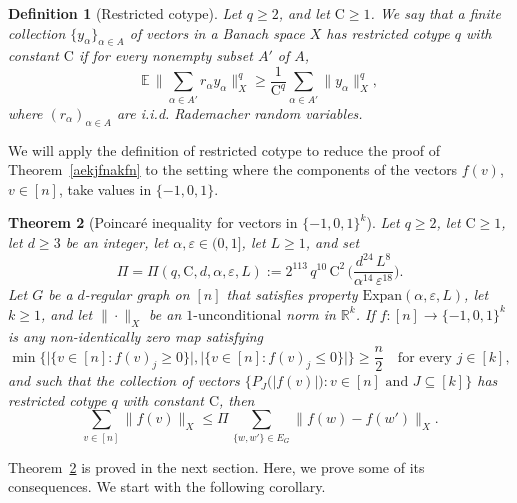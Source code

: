 \documentclass[11pt,leqno]{amsart}
\newtheorem{theorem}{Theorem}[section]
\newtheorem{definition}[theorem]{Definition}
\theoremstyle{remark}
\theoremstyle{plain}
\newcommand{\R}{\mathbb{R}}
\newcommand{\Exp}{\mathbb{E}}
\begin{document}
\begin{definition}[Restricted cotype]
Let $q \geqslant 2$, and let $\mathrm{C}\geqslant 1$. We say that a finite collection $\{y_\alpha\}_{\alpha\in A}$
of vectors in a Banach space $X$ has \emph{restricted cotype $q$ with constant $\mathrm{C}$}
if for every nonempty subset $A'$ of $A$,
\[ \Exp\,\Big\|\sum_{\alpha\in A'} r_\alpha y_\alpha\Big\|_X^q
\geqslant \frac{1}{\mathrm{C}^q} \sum_{\alpha\in A'} \|y_\alpha\|_X^q, \]
where $(r_\alpha)_{\alpha\in A}$ are i.i.d. Rademacher random variables.
\end{definition}
We will apply the definition of restricted cotype to reduce
the proof of Theorem~\ref{aekjfnakfn} to the setting where the components of
the vectors $f(v)$, $v\in[n]$, take values in $\{-1,0,1\}$.
\begin{theorem}[Poincar\'{e} inequality
for vectors in $\{-1,0,1\}^k$]\label{afjnobgiugbo}
Let $q\geqslant 2$, let $\mathrm{C}\geqslant 1$, let $d\geqslant 3$ be an integer, let $\alpha,\varepsilon\in (0,1]$, let $L\geqslant 1$, and set
\begin{equation} \label{eq-new2}
\Pi=\Pi(q,\mathrm{C},d,\alpha,\varepsilon,L) := 2^{113}\, q^{10}\, \mathrm{C}^2\,
\Big( \frac{d^{24}\, L^8}{\alpha^{14}\,\varepsilon^{18}}\Big).
\end{equation}
Let $G$ be a $d$-regular graph on $[n]$ that satisfies property $\mathrm{Expan}(\alpha,\varepsilon,L)$,
let $k\geqslant 1$, and let $\|\cdot\|_X$ be an $1\text{-unconditional}$ norm in $\R^k$.
If $f\colon [n]\to \{-1,0,1\}^k$ is any non-identically zero map satisfying
\begin{equation} \label{eq-new-empirical}
\min\Big\{ \big|\{v\in [n]\colon f(v)_j\geqslant 0\}\big|,
\big|\{v\in [n]\colon f(v)_j\leqslant 0\}\big| \Big\}\geqslant \frac{n}{2} \ \ \ \text{ for every } j\in [k],
\end{equation}
and such that the collection of vectors $\big\{P_J\big(|f(v)|\big)\colon v\in [n] \text{ and }J\subseteq [k]\big\}$
has restricted cotype $q$ with constant $\mathrm{C}$, then
\[ \sum_{v\in[n]}\|f(v)\|_X \leqslant \Pi\,\sum_{\{w,w'\}\in E_G}\|f(w)-f(w')\|_X. \]
\end{theorem}
Theorem~\ref{afjnobgiugbo} is proved in the next section. Here, we prove some of its consequences.
We start with the following corollary.
\end{document}
